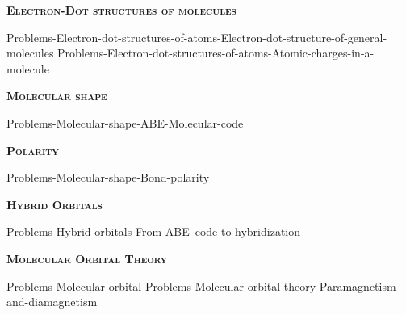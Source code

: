 \documentclass[main.tex]{subfiles}
\newcommand\chapterlabel{Ch-electronicstructure}
\begin{document}
\newpage
\setdoublesep{0.35700 em}  %
\setatomsep{1.78500 em}    %
\setbondoffset{0.18265 em} %
\newcommand{\bondwidth}{0.06642 em} %
\setbondstyle{line width = \bondwidth}
\fancyhfoffset[E,O]{0pt}
\setlength{\columnsep}{30pt}
\begin{conclusion}
\end{conclusion}






\begin{multicols*}{2}\setcounter{numA}{1}  

{\raggedright\textsc{\textbf{Electron-Dot structures of molecules }}\par}
{Problems-Electron-dot-structures-of-atoms-Electron-dot-structure-of-general-molecules}
{Problems-Electron-dot-structures-of-atoms-Atomic-charges-in-a-molecule}
{\raggedright\textsc{\textbf{Molecular shape}}\par}
{Problems-Molecular-shape-ABE-Molecular-code}


{\raggedright\textsc{\textbf{Polarity}}\par}
{Problems-Molecular-shape-Bond-polarity}
{\raggedright\textsc{\textbf{Hybrid Orbitals}}\par}
{Problems-Hybrid-orbitals-From-ABE--code-to-hybridization}
{\raggedright\textsc{\textbf{Molecular Orbital Theory}}\par}
{Problems-Molecular-orbital}
{Problems-Molecular-orbital-theory-Paramagnetism-and-diamagnetism}


 


\end{multicols*} \iftoggle{showfinalanswers}{
\newpage\fancyhfoffset[E,O]{0pt}
\begin{answerbox}
\begin{answersenvironment}
 \begin{localsize}{10}
{ \checkoddpage\ifoddpage    \else   \clearpage\thispagestyle{empty}\mbox{}\clearpage\fi
\Large \bf Answers}
\SetupExSheets{ headings = inline-nr , counter-format = qu) ,}
\printsolutions 
  \vspace{20cm}
 \end{localsize}
 \end{answersenvironment}
\end{answerbox}
}{}
\checkoddpage\ifoddpage   \clearpage\thispagestyle{empty}\mbox{}\clearpage \else   \fi
\end{document}
